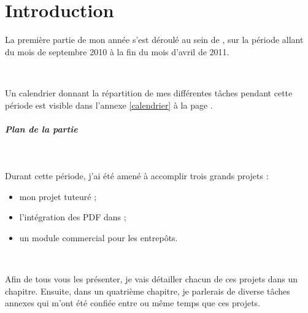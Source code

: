 \chapter{Introduction}
La première partie de mon année s'est déroulé au sein de \solulog, sur la période allant du mois de septembre 2010 à la fin du mois d'avril de 2011.

~

Un calendrier donnant la répartition de mes différentes tâches pendant cette période est visible dans l'annexe \ref{calendrier} à la page \pageref{calendrier}.

\paragraph{Plan de la partie}
~

Durant cette période, j'ai été amené à accomplir trois grands projets :
\begin{itemize}
	\item mon projet tuteuré ;
	\item l'intégration des PDF dans \integrale ;
	\item un module commercial pour les entrepôts.
\end{itemize}

~

Afin de tous vous les présenter, je vais détailler chacun de ces projets dans un chapitre. Ensuite, dans un quatrième chapitre, je parlerais de diverse tâches annexes qui m'ont été confiée entre ou même temps que ces projets.
